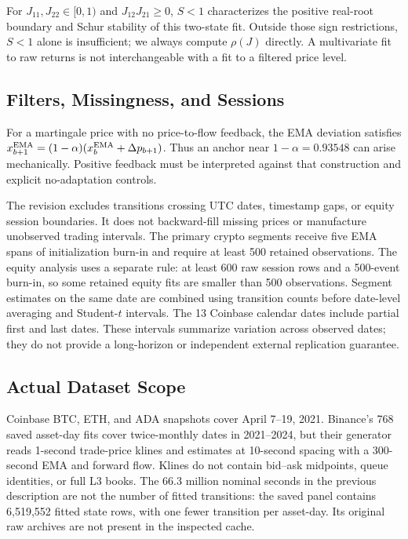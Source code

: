 \documentclass[12pt]{article}
\theoremstyle{definition}
\theoremstyle{remark}
\begin{document}
For $J_{11},J_{22}\in[0,1)$ and $J_{12}J_{21}\ge0$, $S<1$ characterizes the positive real-root boundary and Schur stability of this two-state fit. Outside those sign restrictions, $S<1$ alone is insufficient; we always compute $\rho(J)$ directly. A multivariate fit to raw returns is not interchangeable with a fit to a filtered price level.

\subsection{Filters, Missingness, and Sessions}
For a martingale price with no price-to-flow feedback, the EMA deviation satisfies $x_{b+1}^{\rm EMA}=(1-\alpha)(x_b^{\rm EMA}+\Delta p_{b+1})$. Thus an anchor near $1-\alpha=0.93548$ can arise mechanically. Positive feedback must be interpreted against that construction and explicit no-adaptation controls.

The revision excludes transitions crossing UTC dates, timestamp gaps, or equity session boundaries. It does not backward-fill missing prices or manufacture unobserved trading intervals. The primary crypto segments receive five EMA spans of initialization burn-in and require at least 500 retained observations. The equity analysis uses a separate rule: at least 600 raw session rows and a 500-event burn-in, so some retained equity fits are smaller than 500 observations. Segment estimates on the same date are combined using transition counts before date-level averaging and Student-$t$ intervals. The 13 Coinbase calendar dates include partial first and last dates. These intervals summarize variation across observed dates; they do not provide a long-horizon or independent external replication guarantee.

\subsection{Actual Dataset Scope}
Coinbase BTC, ETH, and ADA snapshots cover April 7--19, 2021. Binance's 768 saved asset-day fits cover twice-monthly dates in 2021--2024, but their generator reads 1-second trade-price klines and estimates at 10-second spacing with a 300-second EMA and forward flow. Klines do not contain bid--ask midpoints, queue identities, or full L3 books. The 66.3 million nominal seconds in the previous description are not the number of fitted transitions: the saved panel contains 6,519,552 fitted state rows, with one fewer transition per asset-day. Its original raw archives are not present in the inspected cache.
\end{document}
